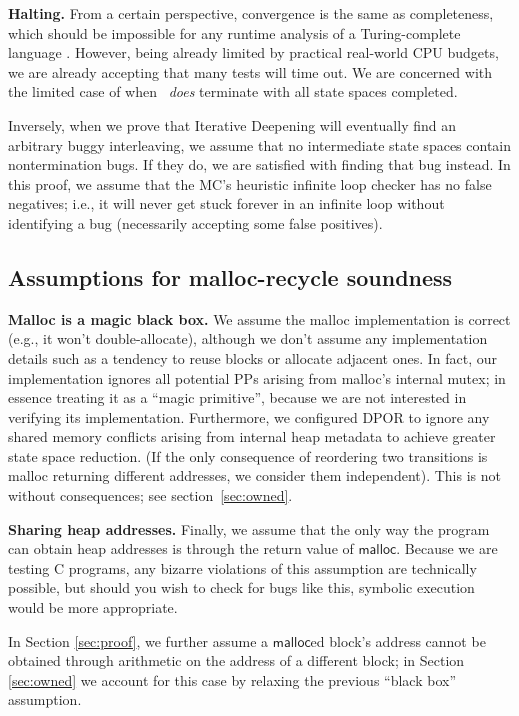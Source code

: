 {\bf Halting.}
From a certain perspective, convergence is the same as completeness,
which should be impossible for any runtime analysis of a Turing-complete language \cite{entscheidungsproblem}.
However, being already limited by practical real-world CPU budgets,
we are already accepting that many tests will time out.
We are concerned with the limited case of when \quicksand~{\em does} terminate with all state spaces completed.

Inversely, when we prove that Iterative Deepening will eventually find an arbitrary buggy interleaving,
we assume that no intermediate state spaces contain nontermination bugs.
If they do,
we are satisfied with finding that bug instead.
In this proof, we assume that the MC's heuristic infinite loop checker has no false negatives;
i.e., it will never get stuck forever in an infinite loop without identifying a bug (necessarily accepting some false positives).

\subsection{Assumptions for malloc-recycle soundness}

{\bf Malloc is a magic black box.}
We assume the malloc implementation is correct (e.g., it won't double-allocate),
although we don't assume any implementation details such as a tendency to reuse blocks or allocate adjacent ones.
In fact,
our implementation ignores all potential PPs arising from malloc's internal mutex;
in essence treating it as a ``magic primitive'', because we are not interested in verifying its implementation.
Furthermore, we configured DPOR to ignore any shared memory conflicts arising from internal heap metadata
to achieve greater state space reduction.
(If the only consequence of reordering two transitions is malloc returning different addresses, we consider them independent).
This is not without consequences; see section~\ref{sec:owned}.

{\bf Sharing heap addresses.}
Finally, we assume that the only way the program can obtain heap addresses is through the return value of $\mathsf{malloc}$.
Because we are testing C programs, any bizarre violations of this assumption are technically possible,
but should you wish to check for bugs like this,
symbolic execution \cite{klee} would be more appropriate.

In Section \ref{sec:proof}, we further assume a $\mathsf{malloc}$ed block's address cannot be obtained through arithmetic on the address of a different block;
in Section \ref{sec:owned} we account for this case by relaxing the previous ``black box'' assumption.
